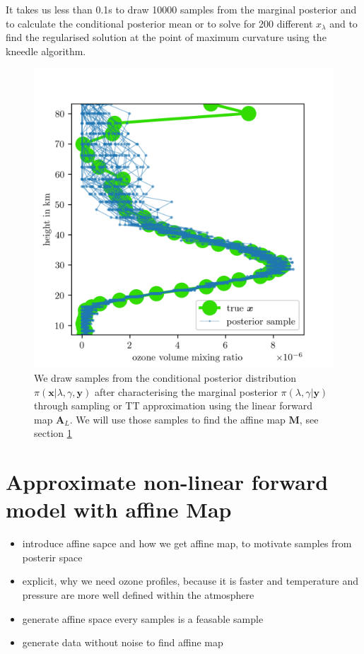 It takes us less than 0.1s to draw 10000 samples from the marginal posterior and to calculate the conditional posterior mean or to solve for 200 different $x_{\lambda}$ and to find the regularised solution at the point of maximum curvature using the kneedle algorithm.\\

\begin{figure}[ht!]
	\centering
	\includegraphics{FirstTestRes.png}
	\caption[Ozone samples of the conditional posterior.]{We draw samples from the conditional posterior distribution  $\pi(\bm{x}|\lambda,\gamma , \bm{y})$ after characterising the marginal posterior $\pi(\lambda,\gamma | \bm{y})$ through sampling or TT approximation using the linear forward map $\bm{A}_L$. We will use those samples to find the affine map $\bm{M}$, see section \ref{sec:affineMap}}
	\label{fig:O3Samp}
\end{figure}

\section{Approximate non-linear forward model with affine Map} 
\label{sec:affineMap}
\begin{itemize}
	\item introduce affine sapce and how we get affine map, to motivate samples from posterir space
	\item explicit, why we need ozone profiles, because it is faster and temperature and pressure are more well defined within the atmosphere
	\item generate affine space every samples is a feasable sample
	\item generate data without noise to find affine map
\end{itemize}

